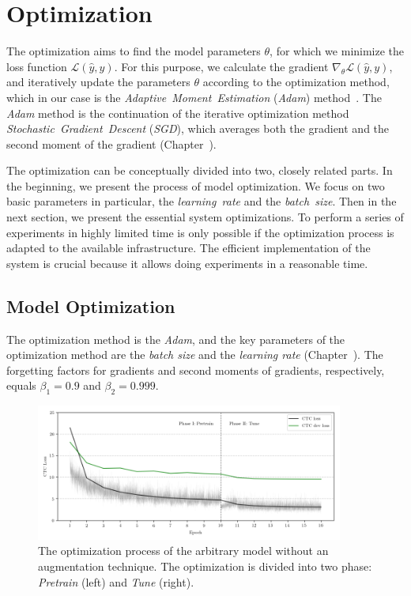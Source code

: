 
\chapter{Optimization}\label{ch:optimization}

The optimization aims to find the model parameters $\theta$,
for which we minimize the loss function $\mathcal{L}(\hat{y}, y)$.
For this purpose, we calculate the gradient $\nabla_{\theta}\mathcal{L}(\hat{y}, y)$,
and iteratively update the parameters $\theta$ according to the optimization method, which in our case
is the \textit{Adaptive~Moment~Estimation} (\textit{Adam}) method~\cite{kingma2014}.
The \textit{Adam} method is the continuation of the iterative optimization method \textit{Stochastic~Gradient~Descent}
(\textit{SGD}), which averages both the gradient and the second moment of the gradient (Chapter~).

The optimization can be conceptually divided into two, closely related parts.
In the beginning, we present the process of model optimization.
We focus on two basic parameters in particular, the \textit{learning~rate} and the \textit{batch~size}.
Then in the next section, we present the essential system optimizations.
To perform a series of experiments in highly limited time is only possible
if the optimization process is adapted to the available infrastructure.
The efficient implementation of the system is crucial because
it allows doing experiments in a reasonable time.


\section{Model Optimization}\label{sec:model-optimization}

The optimization method is the \textit{Adam}, and the key parameters of the optimization method are
the \textit{batch size} and the \textit{learning rate} (Chapter~).
The forgetting factors for gradients and second moments of gradients, respectively, equals
$\beta_1=0.9$ and $\beta_2=0.999$.

\begin{figure}[h]
    \centering
    \includegraphics[width=0.9\textwidth]{figures/optimization-learning_rate.png}
    \caption{
The optimization process of the arbitrary model without an augmentation technique.
The optimization is divided into two phase: \textit{Pretrain} (left) and \textit{Tune} (right).
}
    \label{fig:learning_rate}
\end{figure}

